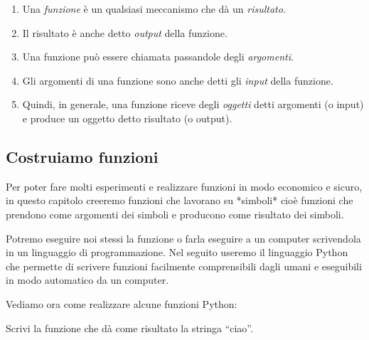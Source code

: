 \begin{enumerate} [noitemsep]
\item Una \emph{funzione} è un qualsiasi meccanismo che dà un 
\emph{risultato}.
\item Il risultato è anche detto \emph{output} della funzione.
\item Una funzione può essere chiamata passandole degli \emph{argomenti}.
\item Gli argomenti di una funzione sono anche detti gli \emph{input} 
della funzione.
\item Quindi, in generale, una funzione riceve degli \emph{oggetti} detti 
argomenti (o input) e produce un oggetto detto risultato (o output).
\end{enumerate}

\subsection{Costruiamo funzioni}
\label{sec:funzioni2_costruiamo}

Per poter fare molti esperimenti e realizzare funzioni in modo economico e 
sicuro, in questo capitolo creeremo funzioni che lavorano su *simboli* cioè 
funzioni che prendono come argomenti dei simboli e producono come risultato 
dei simboli.

Potremo eseguire noi stessi la funzione o farla eseguire a un computer 
scrivendola in un linguaggio di programmazione. 
Nel seguito useremo il linguaggio Python che permette di scrivere funzioni 
facilmente comprensibili dagli umani e eseguibili in modo automatico da un 
computer.

Vediamo ora come realizzare alcune funzioni Python:

\begin{esempio}
 Scrivi la funzione che dà come risultato la stringa  ``ciao''.
 
\end{esempio}

